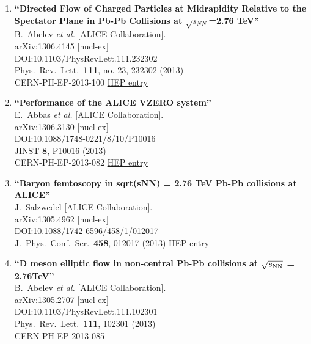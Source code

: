 \begin{enumerate}
\item%
{\bf ``Directed Flow of Charged Particles at Midrapidity Relative to the Spectator Plane in Pb-Pb Collisions at $\sqrt{s_{NN}}$=2.76 TeV''}
  \\{}B.~Abelev {\it et al.} [ALICE Collaboration].
  \\{}arXiv:1306.4145 [nucl-ex]
  \\{}DOI:10.1103/PhysRevLett.111.232302
  \\{}Phys.\ Rev.\ Lett.\  {\bf 111}, no. 23, 232302 (2013)
  \\{}CERN-PH-EP-2013-100
\href{http://inspirehep.net/record/1238980}{HEP entry}
\item%
{\bf ``Performance of the ALICE VZERO system''}
  \\{}E.~Abbas {\it et al.} [ALICE Collaboration].
  \\{}arXiv:1306.3130 [nucl-ex]
  \\{}DOI:10.1088/1748-0221/8/10/P10016
  \\{}JINST {\bf 8}, P10016 (2013)
  \\{}CERN-PH-EP-2013-082
\href{http://inspirehep.net/record/1238451}{HEP entry}
\item%
{\bf ``Baryon femtoscopy in sqrt(sNN) = 2.76 TeV Pb-Pb collisions at ALICE''}
  \\{}J.~Salzwedel [ALICE Collaboration].
  \\{}arXiv:1305.4962 [nucl-ex]
  \\{}DOI:10.1088/1742-6596/458/1/012017
  \\{}J.\ Phys.\ Conf.\ Ser.\  {\bf 458}, 012017 (2013)
\href{http://inspirehep.net/record/1235026}{HEP entry}
\item%
{\bf ``D meson elliptic flow in non-central Pb-Pb collisions at $\sqrt{s_{\rm NN}}$ = 2.76TeV''}
  \\{}B.~Abelev {\it et al.} [ALICE Collaboration].
  \\{}arXiv:1305.2707 [nucl-ex]
  \\{}DOI:10.1103/PhysRevLett.111.102301
  \\{}Phys.\ Rev.\ Lett.\  {\bf 111}, 102301 (2013)
  \\{}CERN-PH-EP-2013-085

\end{enumerate}
